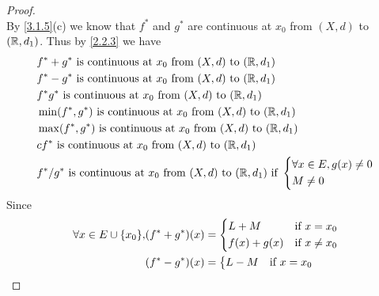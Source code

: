 \begin{proof}
\[  \]
  By \cref{3.1.5}(c) we know that \(f^*\) and \(g^*\) are continuous at \(x_0\) from \((X, d)\) to \((\mathbb{R}, d_1)\).
  Thus by \cref{2.2.3} we have
  \begin{align*}
     & f^* + g^* \text{ is continuous at } x_0 \text{ from } (X, d) \text{ to } (\mathbb{R}, d_1)                                          \\
     & f^* - g^* \text{ is continuous at } x_0 \text{ from } (X, d) \text{ to } (\mathbb{R}, d_1)                                          \\
     & f^* g^* \text{ is continuous at } x_0 \text{ from } (X, d) \text{ to } (\mathbb{R}, d_1)                                            \\
     & \min(f^*, g^*) \text{ is continuous at } x_0 \text{ from } (X, d) \text{ to } (\mathbb{R}, d_1)                                     \\
     & \max(f^*, g^*) \text{ is continuous at } x_0 \text{ from } (X, d) \text{ to } (\mathbb{R}, d_1)                                     \\
     & c f^* \text{ is continuous at } x_0 \text{ from } (X, d) \text{ to } (\mathbb{R}, d_1)                                              \\
     & f^* / g^* \text{ is continuous at } x_0 \text{ from } (X, d) \text{ to } (\mathbb{R}, d_1) \text{ if } \begin{dcases}
                                                                                                        \forall x \in E, g(x) \neq 0 \\
                                                                                                        M \neq 0
                                                                                                      \end{dcases}
  \end{align*}
  Since
  \begin{align*}
    \forall x \in E \cup \{x_0\}, & (f^* + g^*)(x) = \begin{dcases}
                                                       L + M       & \text{if } x = x_0    \\
                                                       f(x) + g(x) & \text{if } x \neq x_0
                                                     \end{dcases}                     \\
                                  & (f^* - g^*)(x) = \begin{dcases}
                                                       L - M       & \text{if } x = x_0    \\

\end{dcases}
\end{align*}
\end{proof}
